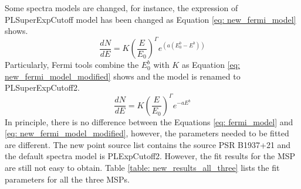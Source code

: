 \documentclass[12pt]{report}
\newcommand{\mycaption}[1]{\protect \caption{#1}}
\begin{document}
    Some spectra models are changed, for instance, the expression of PLSuperExpCutoff model 
    has been changed as Equation \ref{eq: new_fermi_model} shows. \citep{newFermiModel}
    \begin{equation}
      \frac{dN}{dE} = K\left(\frac{E}{E_0}\right)^{\Gamma} e^{\left(a\left(E_0^b-E^b\right)\right)} 
      \label{eq: new_fermi_model}
    \end{equation}
    Particularly, Fermi tools combine the $E_0^b$ with $K$ as Equation 
    \ref{eq: new_fermi_model_modified} shows and the model is renamed to PLSuperExpCutoff2. 
    \begin{equation}
      \frac{dN}{dE} = K\left(\frac{E}{E_0}\right)^{\Gamma} e^{-aE^b} 
      \label{eq: new_fermi_model_modified}
    \end{equation}
    In principle, there is no difference between the Equations \ref{eq: fermi_model} and 
    \ref{eq: new_fermi_model_modified}, however, the parameters needed to be fitted are 
    different. The new point source list contains the source PSR B1937+21 and the default 
    spectra model is PLExpCutoff2. However, the fit results for the MSP are still not easy 
    to obtain. Table \ref{table: new_results_all_three} lists the fit parameters for all 
    the three MSPs.
\end{document}
